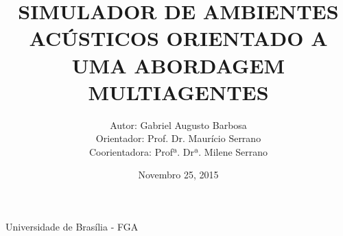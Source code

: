\title
  [Simulador Acústico\hspace{2em}]
  {SIMULADOR DE AMBIENTES ACÚSTICOS
ORIENTADO A UMA ABORDAGEM
MULTIAGENTES}

\author
  [Gabriel Augusto Barbosa]
  {Autor: Gabriel Augusto Barbosa \linebreak \\Orientador: Prof. Dr. Maurício Serrano \\Coorientadora: Profª. Drª. Milene Serrano \linebreak \linebreak \\
  }
  

\date
  {Novembro 25, 2015}

\institute
  {Universidade de Brasília - FGA}